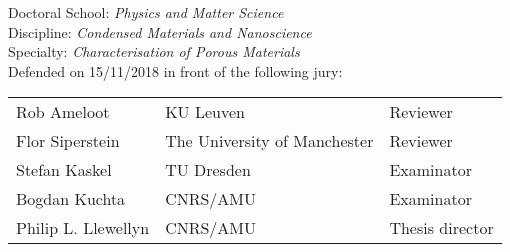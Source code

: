 \begin{titlepage}
\begin{flushleft}
	\vspace{0.2cm}
	\normalsize 
	Doctoral School: \textit{Physics and Matter Science}\\
	Discipline: \textit{Condensed Materials and Nanoscience}\\
	Specialty: \textit{Characterisation of Porous Materials}\\
	\vspace{0.5cm}
    \normalsize Defended on 15/11/2018 in front of the following jury:\\
\end{flushleft}
\vspace{0.3cm}
\begin{tabular}{lll}
	Rob Ameloot & KU Leuven & Reviewer \\
    \vspace{0.08cm}
	Flor Siperstein & The University of Manchester & Reviewer \\
    \vspace{0.08cm}
	Stefan Kaskel & TU Dresden & Examinator \\
    \vspace{0.08cm}
	Bogdan Kuchta & CNRS/AMU & Examinator \\
    \vspace{0.08cm}
	Philip L. Llewellyn & CNRS/AMU & Thesis director \\
\end{tabular}

\end{titlepage}